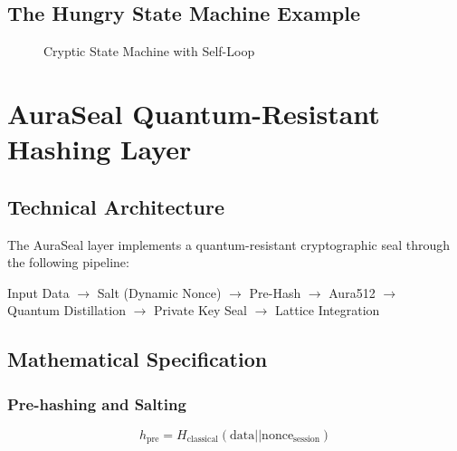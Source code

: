 \documentclass[12pt,a4paper]{article}
\begin{document}
\subsection{The Hungry State Machine Example}

\begin{figure}[h]
\centering
{}
\caption{Cryptic State Machine with Self-Loop}
\end{figure}

\section{AuraSeal Quantum-Resistant Hashing Layer}

\subsection{Technical Architecture}

The AuraSeal layer implements a quantum-resistant cryptographic seal through the following pipeline:

\begin{tcolorbox}[colback=bluesev!10!white,colframe=bluesev!80!black,title=AuraSeal Processing Pipeline]
\begin{center}
Input Data $\rightarrow$ Salt (Dynamic Nonce) $\rightarrow$ Pre-Hash $\rightarrow$ Aura512 $\rightarrow$ \\
Quantum Distillation $\rightarrow$ Private Key Seal $\rightarrow$ Lattice Integration
\end{center}
\end{tcolorbox}

\subsection{Mathematical Specification}

\subsubsection{Pre-hashing and Salting}
\begin{equation}
h_{\text{pre}} = H_{\text{classical}}(\text{data} || \text{nonce}_{\text{session}})
\end{equation}
\end{document}
